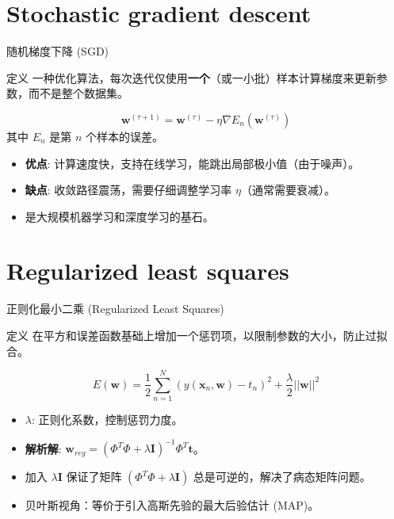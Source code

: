 \documentclass[12pt, aspectratio=169]{beamer}
\newcommand{\bw}{\mathbf{w}}
\newcommand{\bx}{\mathbf{x}}
\newcommand{\bt}{\mathbf{t}}
\newcommand{\bI}{\mathbf{I}}
\begin{document}
\section{Stochastic gradient descent}
\begin{frame}{随机梯度下降 (SGD)}
    \begin{block}{定义}
        一种优化算法，每次迭代仅使用\textbf{一个}（或一小批）样本计算梯度来更新参数，而不是整个数据集。
    \end{block}
    
    \begin{equation*}
        \bw^{(\tau+1)} = \bw^{(\tau)} - \eta \nabla E_n(\bw^{(\tau)})
    \end{equation*}
    其中 $E_n$ 是第 $n$ 个样本的误差。
    
    \vspace{0.5cm}
    \begin{itemize}
        \item \textbf{优点}: 计算速度快，支持在线学习，能跳出局部极小值（由于噪声）。
        \item \textbf{缺点}: 收敛路径震荡，需要仔细调整学习率 $\eta$（通常需要衰减）。
        \item 是大规模机器学习和深度学习的基石。
    \end{itemize}
\end{frame}

\section{Regularized least squares}
\begin{frame}{正则化最小二乘 (Regularized Least Squares)}
    \begin{block}{定义}
        在平方和误差函数基础上增加一个惩罚项，以限制参数的大小，防止过拟合。
    \end{block}
    
    \begin{equation*}
        E(\bw) = \frac{1}{2}\sum_{n=1}^N (y(\bx_n, \bw) - t_n)^2 + \frac{\lambda}{2} ||\bw||^2
    \end{equation*}
    
    \vspace{0.5cm}
    \begin{itemize}
        \item $\lambda$: 正则化系数，控制惩罚力度。
        \item \textbf{解析解}: $\bw_{reg} = (\Phi^T \Phi + \lambda \bI)^{-1} \Phi^T \bt$。
        \item 加入 $\lambda \bI$ 保证了矩阵 $(\Phi^T \Phi + \lambda \bI)$ 总是可逆的，解决了病态矩阵问题。
        \item 贝叶斯视角：等价于引入高斯先验的最大后验估计 (MAP)。
    \end{itemize}
\end{frame}
\end{document}
